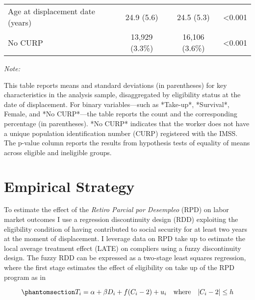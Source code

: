 \documentclass[
  4pt,
]{report}
\begin{document}
\begin{table}
{{\begin{threeparttable}
\begin{tabular}{lccc}
\hspace{1em}Age at displacement date (years) & 24.9 (5.6) & 24.5 (5.3) & <0.001\\
\hspace{1em}No CURP & 13,929 (3.3\%) & 16,106 (3.6\%) & <0.001\\
\bottomrule
\end{tabular}
\begin{tablenotes}[para]
\item \textit{Note:} 
\item 
    This table reports means and standard deviations (in parentheses) for key characteristics in the analysis sample, disaggregated by eligibility status at the date of displacement. For binary variables—such as *Take-up*, *Survival*, Female, and *No CURP*—the table reports the count and the corresponding percentage (in parentheses). *No CURP* indicates that the worker does not have a unique population identification number (CURP) registered with the IMSS. The p-value column reports the results from hypothesis tests of equality of means across eligible and ineligible groups.
    
\end{tablenotes}
\end{threeparttable}}

}

\end{table}%

\chapter{Empirical Strategy}\label{sec-empirical-strategy}

To estimate the effect of the \emph{Retiro Parcial por Desempleo} (RPD)
on labor market outcomes I use a regression discontinuity design (RDD)
exploiting the eligibility condition of having contributed to social
security for at least two years at the moment of displacement. I
leverage data on RPD take up to estimate the local average treatment
effect (LATE) on compliers using a fuzzy discontinuity design. The fuzzy
RDD can be expressed as a two-stage least squares regression, where the
first stage estimates the effect of eligibility on take up of the RPD
program as in

\begin{equation}\phantomsection\label{eq-1s}{
T_{i} = \alpha + \beta D_i + f(C_i - 2) + u_i \quad \text{where} \quad |C_i - 2| \le h
}\end{equation}
\end{document}
